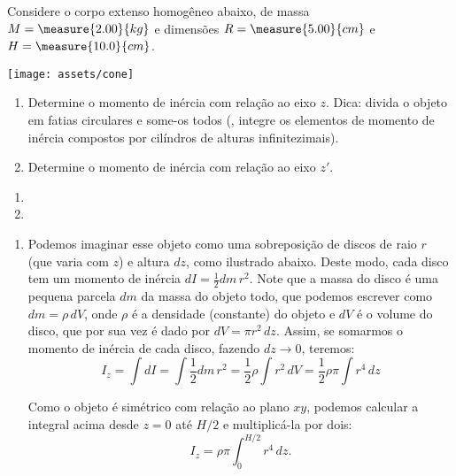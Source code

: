 \begin{question}
    Considere o corpo extenso homogêneo abaixo, de massa $M = \measure{2.00}{kg}$ e dimensões $R = \measure{5.00}{cm}$ e $H = \measure{10.0}{cm}$.
    
    \begin{center}
      \texttt{[image: assets/cone]}
    \end{center}
    
    \begin{enumerate}
      \item Determine o momento de inércia com relação ao eixo $z$.
      Dica: divida o objeto em fatias circulares e some-os todos (\ie, integre os elementos de momento de inércia compostos por cilíndros de alturas infinitezimais).
      \item Determine o momento de inércia com relação ao eixo $z'$.
    \end{enumerate}

    \begin{answer}
      \begin{enumerate}
        \item {}
        \item {}
      \end{enumerate}
    \end{answer}

    \begin{solution}
      \begin{enumerate}
        \item Podemos imaginar esse objeto como uma sobreposição de discos de raio $r$ (que varia com $z$) e altura $dz$, como ilustrado abaixo.
        Deste modo, cada disco tem um momento de inércia $dI = \frac{1}{2}dm\, r^2$.
        Note que a massa do disco é uma pequena parcela $dm$ da massa do objeto todo, que podemos escrever como $dm = \rho\, dV$, onde $\rho$ é a densidade (constante) do objeto e $dV$ é o volume do disco, que por sua vez é dado por $dV = \pi r^2\, dz$.
        Assim, se somarmos o momento de inércia de cada disco, fazendo $dz \to 0$, teremos:
        \begin{equation*}
        I_z = \int dI = \int\frac{1}{2}dm\, r^2 = \frac{1}{2}\rho \int r^2\, dV = \frac{1}{2}\rho\pi \int r^4\, dz
        \end{equation*}
        
        
        Como o objeto é simétrico com relação ao plano $xy$, podemos calcular a integral acima desde $z = 0$ até $H/2$ e multiplicá-la por dois:
        \begin{equation*}
        I_z = \rho\pi \int_{0}^{H/2} r^4\, dz.
        \end{equation*}
        

\end{enumerate}
\end{solution}
\end{question}
